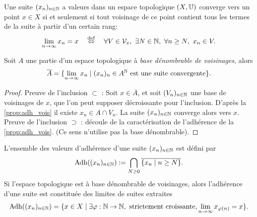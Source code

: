 
\begin{definition}
\label{def:cvSuite}
%
Une suite $(x_n)_{n \in \mathbb{N}}$ a valeurs dans un espace topologique $(X,\mathbb{U})$ converge vers un point $x \in X$ si et seulement si tout voisinage de ce point contient tous les termes de la suite à partir d'un certain rang:
\begin{equation}
	\lim_{n \to \infty} x_n = x \quad \overset {\tiny \mathrm{def}} \Leftrightarrow \quad \forall V \in \mathcal{V}_x,\ \exists N \in \mathbb{N},\ \forall n \geq N,\ x_n \in V.
\end{equation}
	
\end{definition}

\begin{proposition}
\label{prop:adhSuite}
%
	Soit $A$ une partie d'un espace topologique à \emph{base dénombrable de voisinages}, alors 
	$$
		\overline A = \{ \lim_{n \to \infty} x_n \mid (x_n)_n \in A^{\mathbb{N}} \text{ est une suite convergente} \}.
	$$
\end{proposition}

\begin{proof}
	Preuve de l'inclusion $\subset$ :
	Soit $x \in \overline A$, et soit $(V_n)_{n \in \mathbb{N}}$ une base de voisinages de $x$, que l'on peut supposer décroissante pour l'inclusion. D'après la \cref{prop:adh_vois} il existe $x_n \in A \cap V_n$. La suite $(x_n)_{n \in \mathbb{N}}$ converge alors vers $x$. Preuve de l'inclusion $\supset$ : découle de la caractérisation de l'adhérence de la \cref{prop:adh_vois}. (Ce sens n'utilise pas la base dénombrable).
\end{proof}

\begin{proposition}
\label{prop:adhSousSuite}
%
	L'ensemble des valeurs d'adhérence d'une suite $(x_n)_{n \in \mathbb{N}}$ est défini par 
	\begin{equation}
	\label{eqdef:adherence_suite}		
		\Adh((x_n)_{n \in \bN}) := \bigcap_{N \geq 0} \overline {\{x_n \mid n \geq N\}}.
\leancheck{eqdef:adherence_suite}%
	\end{equation}
	Si l'espace topologique est à base dénombrable de voisinages, alors l'adhérence d'une suite est constituée des limites de suites extraites
	\begin{equation}
		\operatorname{Adh}((x_n)_{n \in \mathbb{N}}) = \{x \in X \mid \exists \varphi : \mathbb{N}\to \mathbb{N}, \text{ strictement croissante}, \lim_{n \to \infty} x_{\varphi(n)} = x\}.
	\end{equation}	
\end{proposition}

